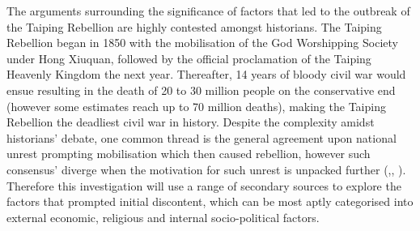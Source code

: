 The arguments surrounding the significance of factors that led to the outbreak of the Taiping Rebellion are highly contested amongst historians. The Taiping Rebellion began in 1850 with the mobilisation of the God Worshipping Society under Hong Xiuquan, followed by the official proclamation of the Taiping Heavenly Kingdom the next year. Thereafter, 14 years of bloody civil war would ensue resulting in the death of 20 to 30 million people on the conservative end (however some estimates reach up to 70 million deaths), making the Taiping Rebellion the deadliest civil war in history. Despite the complexity amidst historians’ debate, one common thread is the general agreement upon national unrest prompting mobilisation which then caused rebellion, however such consensus’ diverge when the motivation for such unrest is unpacked further (\cite{HMHyndmanEvolution},\cite{leungCritiqueMarxsView2013}, \cite{zotero-item-121}). Therefore this investigation will use a range of secondary sources to explore the factors that prompted initial discontent, which can be most aptly categorised into external economic, religious and internal socio-political factors. \\


